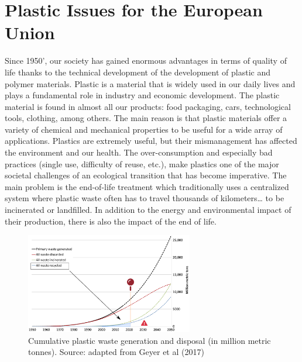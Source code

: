 \documentclass[
  11pt,
]{article}
\begin{document}
\newpage

\hypertarget{sec-plastic}{%
\section{Plastic Issues for the European Union}\label{sec-plastic}}

Since 1950', our society has gained enormous advantages in terms of
quality of life thanks to the technical development of the development
of plastic and polymer materials. Plastic is a material that is widely
used in our daily lives and plays a fundamental role in industry and
economic development. The plastic material is found in almost all our
products: food packaging, cars, technological tools, clothing, among
others. The main reason is that plastic materials offer a variety of
chemical and mechanical properties to be useful for a wide array of
applications. Plastics are extremely useful, but their mismanagement has
affected the environment and our health. The over-consumption and
especially bad practices (single use, difficulty of reuse, etc.), make
plastics one of the major societal challenges of an ecological
transition that has become imperative. The main problem is the
end-of-life treatment which traditionally uses a centralized system
where plastic waste often has to travel thousands of kilometers\ldots{}
to be incinerated or landfilled. In addition to the energy and
environmental impact of their production, there is also the impact of
the end of life.

\begin{figure}[H]

{\centering \includegraphics[width=0.65\textwidth,height=\textheight]{figures/Plastic-problem.png}

}

\caption{\label{fig-plastic-problem}Cumulative plastic waste generation
and disposal (in million metric tonnes). Source: adapted from Geyer et
al (2017)}

\end{figure}
\end{document}
